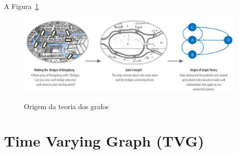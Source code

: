 A  Figura~\ref{fig:graphtheory}

 \begin{figure}[!h]
 \caption{Origem da teoria dos grafos}
     \centering
     \includegraphics[scale=.40]{./Capitulo2/img/origins-graph-theory.png}
         \label{fig:graphtheory}
 \end{figure}
 
 
\section{Time Varying Graph (TVG)} \label{sec:fund}

